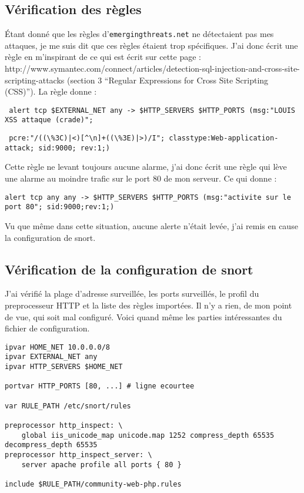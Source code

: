 \documentclass[oneside,10pt]{article}
\begin{document}
\subsection{V\'erification des r\`egles}
\'Etant donn\'e que les r\`egles d'\verb+emergingthreats.net+ ne d\'etectaient pas mes attaques, je me suis dit que ces r\`egles \'etaient trop sp\'ecifiques.
J'ai donc \'ecrit une r\`egle en m'inspirant de ce qui est \'ecrit sur cette page : http://www.symantec.com/connect/articles/detection-sql-injection-and-cross-site-scripting-attacks (section 3 ``Regular Expressions for Cross Site Scripting (CSS)'').
La r\`egle donne :
\begin{verbatim} alert tcp $EXTERNAL_NET any -> $HTTP_SERVERS $HTTP_PORTS (msg:"LOUIS XSS attaque (crade)";\end{verbatim}
\begin{verbatim} pcre:"/((\%3C)|<)[^\n]+((\%3E)|>)/I"; classtype:Web-application-attack; sid:9000; rev:1;) \end{verbatim}
Cette r\`egle ne levant toujours aucune alarme, j'ai donc \'ecrit une r\`egle qui l\`eve une alarme au moindre trafic sur le port 80 de mon serveur.
Ce qui donne :
\begin{verbatim}alert tcp any any -> $HTTP_SERVERS $HTTP_PORTS (msg:"activite sur le port 80"; sid:9000;rev:1;)\end{verbatim}
Vu que m\^eme dans cette situation, aucune alerte n'\'etait lev\'ee, j'ai remis en cause la configuration de snort.

\subsection{V\'erification de la configuration de snort}
J'ai v\'erifi\'e la plage d'adresse surveill\'ee, les ports surveill\'es, le profil du preprocesseur HTTP et la liste des r\`egles import\'ees.
Il n'y a rien, de mon point de vue, qui soit mal configur\'e.
Voici quand m\^eme les parties int\'eressantes du fichier de configuration.
\begin{verbatim}
ipvar HOME_NET 10.0.0.0/8
ipvar EXTERNAL_NET any
ipvar HTTP_SERVERS $HOME_NET

portvar HTTP_PORTS [80, ...] # ligne ecourtee

var RULE_PATH /etc/snort/rules

preprocessor http_inspect: \
    global iis_unicode_map unicode.map 1252 compress_depth 65535 decompress_depth 65535
preprocessor http_inspect_server: \
    server apache profile all ports { 80 }

include $RULE_PATH/community-web-php.rules
\end{verbatim}
\end{document}
